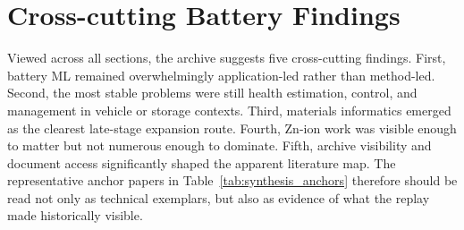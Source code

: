 \documentclass[journal]{IEEEtran}
\begin{document}
\section{Cross-cutting Battery Findings}
Viewed across all sections, the archive suggests five cross-cutting findings. First, battery ML remained overwhelmingly application-led rather than method-led. Second, the most stable problems were still health estimation, control, and management in vehicle or storage contexts. Third, materials informatics emerged as the clearest late-stage expansion route. Fourth, Zn-ion work was visible enough to matter but not numerous enough to dominate. Fifth, archive visibility and document access significantly shaped the apparent literature map. The representative anchor papers in Table~\ref{tab:synthesis_anchors} therefore should be read not only as technical exemplars, but also as evidence of what the replay made historically visible.
\end{document}
